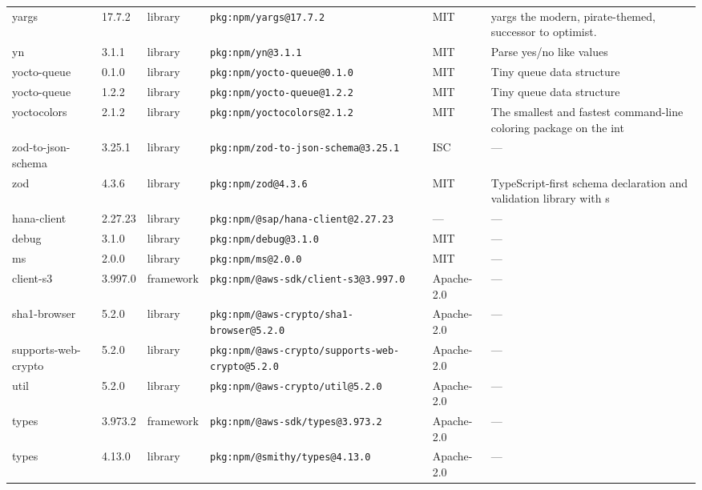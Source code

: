 \documentclass[11pt,a4paper]{article}
\begin{document}
\begin{longtable}{|p{4cm}|p{2cm}|p{1.6cm}|p{5cm}|p{1.5cm}|p{3.5cm}|}
\raggedright yargs & 17.7.2 & library & \small\texttt{pkg:npm/yargs@17.7.2} & MIT & \small yargs the modern, pirate-themed, successor to optimist. \\
\raggedright yn & 3.1.1 & library & \small\texttt{pkg:npm/yn@3.1.1} & MIT & \small Parse yes/no like values \\
\raggedright yocto-queue & 0.1.0 & library & \small\texttt{pkg:npm/yocto-queue@0.1.0} & MIT & \small Tiny queue data structure \\
\raggedright yocto-queue & 1.2.2 & library & \small\texttt{pkg:npm/yocto-queue@1.2.2} & MIT & \small Tiny queue data structure \\
\raggedright yoctocolors & 2.1.2 & library & \small\texttt{pkg:npm/yoctocolors@2.1.2} & MIT & \small The smallest and fastest command-line coloring package on the int \\
\raggedright zod-to-json-schema & 3.25.1 & library & \small\texttt{pkg:npm/zod-to-json-schema@3.25.1} & ISC & \small — \\
\raggedright zod & 4.3.6 & library & \small\texttt{pkg:npm/zod@4.3.6} & MIT & \small TypeScript-first schema declaration and validation library with s \\
\raggedright hana-client & 2.27.23 & library & \small\texttt{pkg:npm/@sap/hana-client@2.27.23} & — & \small — \\
\raggedright debug & 3.1.0 & library & \small\texttt{pkg:npm/debug@3.1.0} & MIT & \small — \\
\raggedright ms & 2.0.0 & library & \small\texttt{pkg:npm/ms@2.0.0} & MIT & \small — \\
\raggedright client-s3 & 3.997.0 & framework & \small\texttt{pkg:npm/@aws-sdk/client-s3@3.997.0} & Apache-2.0 & \small — \\
\raggedright sha1-browser & 5.2.0 & library & \small\texttt{pkg:npm/@aws-crypto/sha1-browser@5.2.0} & Apache-2.0 & \small — \\
\raggedright supports-web-crypto & 5.2.0 & library & \small\texttt{pkg:npm/@aws-crypto/supports-web-crypto@5.2.0} & Apache-2.0 & \small — \\
\raggedright util & 5.2.0 & library & \small\texttt{pkg:npm/@aws-crypto/util@5.2.0} & Apache-2.0 & \small — \\
\raggedright types & 3.973.2 & framework & \small\texttt{pkg:npm/@aws-sdk/types@3.973.2} & Apache-2.0 & \small — \\
\raggedright types & 4.13.0 & library & \small\texttt{pkg:npm/@smithy/types@4.13.0} & Apache-2.0 & \small — \\

\end{longtable}
\end{document}
